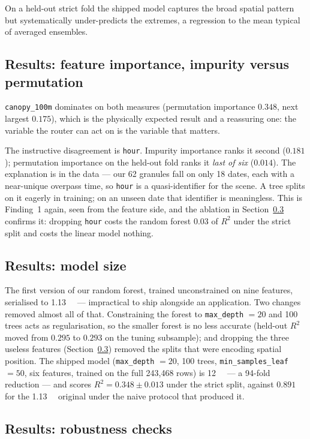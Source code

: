 \documentclass[10pt]{article}   %
\begin{document}
On a held-out strict fold the shipped model captures the broad spatial pattern but
systematically under-predicts the extremes, a regression to the mean typical of averaged
ensembles.

\subsection{Results: feature importance, impurity versus permutation}
\label{sec:importance}
\texttt{canopy\_100m} dominates on both measures (permutation importance $0.348$, next
largest $0.175$), which is the physically expected result and a reassuring one: the variable
the router can act on is the variable that matters.

The instructive disagreement is \texttt{hour}. Impurity importance ranks it second
($0.181$); permutation importance on the held-out fold ranks it \emph{last of six}
($0.014$). The explanation is in the data --- our 62 granules fall on only 18 dates, each
with a near-unique overpass time, so \texttt{hour} is a quasi-identifier for the scene. A
tree splits on it eagerly in training; on an unseen date that identifier is meaningless.
This is Finding~1 again, seen from the feature side, and the ablation in
Section~\ref{sec:robust-results} confirms it: dropping \texttt{hour} costs the random forest
$0.03$ of $R^2$ under the strict split and costs the linear model nothing.

\subsection{Results: model size}
The first version of our random forest, trained unconstrained on nine features, serialised to
\SI{1.13}{\giga\byte} --- impractical to ship alongside an application. Two changes removed
almost all of that. Constraining the forest to \texttt{max\_depth} $=20$ and 100 trees acts
as regularisation, so the smaller forest is no less accurate (held-out $R^2$ moved from
$0.295$ to $0.293$ on the tuning subsample); and dropping the three useless
features (Section~\ref{sec:robust-results}) removed the splits that were encoding spatial
position. The shipped model (\texttt{max\_depth} $=20$, 100 trees,
\texttt{min\_samples\_leaf} $=50$, six features, trained on the full 243{,}468 rows) is
\SI{12}{\mega\byte} --- a \num{94}-fold reduction --- and scores $R^2 = 0.348 \pm 0.013$
under the strict split, against $0.891$ for the \SI{1.13}{\giga\byte} original under the
naive protocol that produced it.

\subsection{Results: robustness checks}
\label{sec:robust-results}
\end{document}
